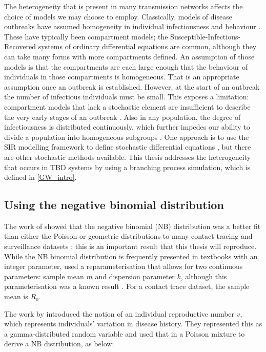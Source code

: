 \documentclass[hidelinks]{article}
\begin{document}
The heterogeneity that is present in many transmission networks affects the choice of models we may choose to employ. Classically, models of disease outbreaks have assumed homogeneity in individual infectiousness and behaviour \citep{Garske2008}. These have typically been compartment models; the Susceptible-Infectious-Recovered systems of ordinary differential equations are common, although they can take many forms with more compartments defined. An assumption of those models is that the compartments are each large enough that the behaviour of individuals in those compartments is homogeneous. That is an appropriate assumption once an outbreak is established. However, at the start of an outbreak the number of infectious individuals must be small. This exposes a limitation: compartment models that lack a stochastic element are insufficient to describe the very early stages of an outbreak \citep{Brauer2008a}. Also in any population, the degree of infectiousness is distributed continuously, which further impedes our ability to divide a population into homogeneous subgroups \citep{LloydSmith2005}. One approach is to use the SIR modelling framework to define stochastic differential equations \citep{Allen2017}, but there are other stochastic methods available. This thesis addresses the heterogeneity that occurs in TBD systems by using a branching process simulation, which is defined in \ref{GW_intro}.

\subsection{Using the negative binomial distribution}

The work of \citet{LloydSmith2005} showed that the negative binomial (NB) distribution was a better fit than either the Poisson or geometric distributions to many contact tracing and surveillance datasets \citep{LloydSmith2005}; this is an important result that this thesis will reproduce. While the NB binomial distribution is frequently presented in textbooks with an integer parameter, \citet{LloydSmith2005} used a reparameterisation that allows for two continuous parameters: sample mean $ m $ and dispersion parameter $ k $, although this parameterisation was a known result \citep{Rice2007}. For a contact trace dataset, the sample mean is $ R_0 $.

The work by \citet{LloydSmith2005} introduced the notion of an individual reproductive number $ v $, which represents individuals' variation in disease history. They represented this as a gamma-distributed random variable and used that in a Poisson mixture to derive a NB distribution, as below:
\end{document}
